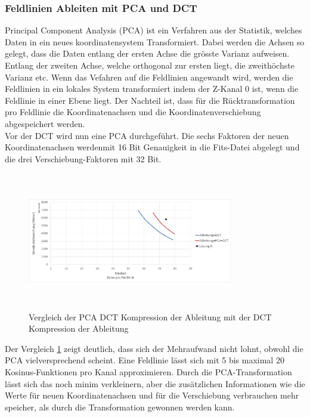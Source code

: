 \subsubsection{Feldlinien Ableiten mit PCA und DCT} 
Principal Component Analysis (PCA)\cite{abdi2010principal} ist ein Verfahren aus der Statistik, welches Daten in ein neues koordinatensystem Transformiert. Dabei werden die Achsen so gelegt, dass die Daten entlang der ersten Achse die grösste Varianz aufweisen. Entlang der zweiten Achse, welche orthogonal zur ersten liegt, die zweithöchste Varianz etc. Wenn das Vefahren auf die Feldlinien angewandt wird, werden die Feldlinien in ein lokales System transformiert indem der Z-Kanal 0 ist, wenn die Feldlinie in einer Ebene liegt. Der Nachteil ist, dass für die Rücktransformation pro Feldlinie die Koordinatenachsen und die Koordinatenverschiebung abgespeichert werden.\\
Vor der DCT wird nun eine PCA durchgeführt. Die sechs Faktoren der neuen Koordinatenachsen werdenmit  16 Bit Genauigkeit in die Fits-Datei abgelegt und die drei Verschiebung-Faktoren mit 32 Bit.
\begin{figure}[!htbp]
	\center
	\includegraphics[width=0.8\textwidth,height=6cm,keepaspectratio]{./pictures/resultate/loesung1/loesung1-4/loesung1_4.png}
	\caption{Vergleich der PCA DCT Kompression der Ableitung mit der DCT Kompression der Ableitung}
	\label{resultate:loesung1:dct:pca}
\end{figure}
Der Vergleich \ref{resultate:loesung1:dct:pca} zeigt deutlich, dass sich der Mehraufwand nicht lohnt, obwohl die PCA vielversprechend scheint. Eine Feldlinie lässt sich mit 5 bis maximal 20 Kosinus-Funktionen pro Kanal approximieren. Durch die PCA-Transformation lässt sich das noch minim verkleinern, aber die zusätzlichen Informationen wie die Werte für neuen Koordinatenachsen und für die Verschiebung verbrauchen mehr speicher, als durch die Transformation gewonnen werden kann.\\
